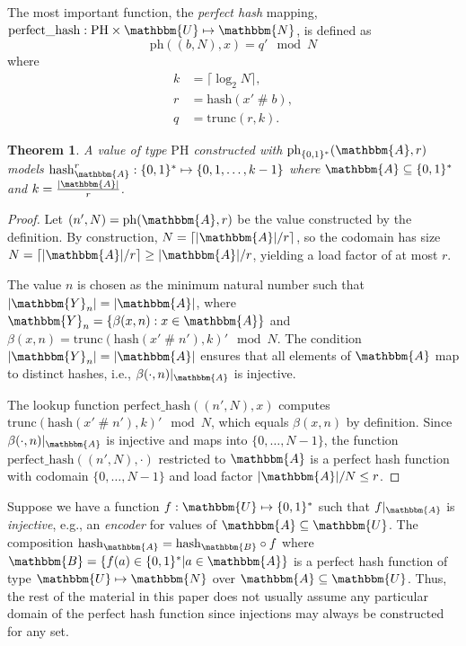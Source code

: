 \documentclass[hidelinks,11pt,final]{article}
\newcommand{\envnumstyle}{section}
\theoremstyle{plain}
\newtheorem{theorem}{Theorem}[\envnumstyle]
\newcommand{\cat}{\mathbin{\#}}
\begin{document}
The most important function, the \emph{perfect hash} mapping, $\mathrm{perfect\_hash} : \mathrm{PH} \times \mathbbm{U} \mapsto \mathbbm{N}$, is defined as
\begin{equation}
	\mathrm{ph}((b,N),x) = q' \mod N
\end{equation}
where
\begin{equation}
\begin{split}
	k &= \lceil \log_2 N \rceil,\\
	r &= \mathrm{hash}(x' \cat b),\\
	q &= \mathrm{trunc}(r,k).
\end{split}
\end{equation}



\begin{theorem}
A value of type $\mathrm{PH}$ constructed with $\mathrm{ph}_{\{0,1\}^*}(\mathbbm{A},r)$ \emph{models} $\mathrm{hash}_{\mathbbm{A}}^{r} : \{0,1\}^* \mapsto \{0,1,\ldots,k-1\}$ where $\mathbbm{A} \subseteq \{0,1\}^*$ and $k = \frac{|\mathbbm{A}|}{r}$.
\end{theorem}
\begin{proof}
Let $(n', N) = \mathrm{ph}(\mathbbm{A}, r)$ be the value constructed by the definition. By construction, $N = \lceil |\mathbbm{A}|/r \rceil$, so the codomain has size $N = \lceil |\mathbbm{A}|/r \rceil \geq |\mathbbm{A}|/r$, yielding a load factor of at most $r$.

The value $n$ is chosen as the minimum natural number such that $|\mathbbm{Y}_n| = |\mathbbm{A}|$, where $\mathbbm{Y}_n = \{\beta(x,n) : x \in \mathbbm{A}\}$ and $\beta(x,n) = \mathrm{trunc}(\mathrm{hash}(x' \cat n'), k)' \mod N$. The condition $|\mathbbm{Y}_n| = |\mathbbm{A}|$ ensures that all elements of $\mathbbm{A}$ map to distinct hashes, i.e., $\beta(\cdot, n)|_{\mathbbm{A}}$ is injective.

The lookup function $\mathrm{perfect\_hash}((n', N), x)$ computes $\mathrm{trunc}(\mathrm{hash}(x' \cat n'), k)' \mod N$, which equals $\beta(x, n)$ by definition. Since $\beta(\cdot, n)|_{\mathbbm{A}}$ is injective and maps into $\{0, \ldots, N-1\}$, the function $\mathrm{perfect\_hash}((n', N), \cdot)$ restricted to $\mathbbm{A}$ is a perfect hash function with codomain $\{0, \ldots, N-1\}$ and load factor $|\mathbbm{A}|/N \leq r$.
\end{proof}

Suppose we have a function $f : \mathbbm{U} \mapsto \{0,1\}^*$ such that $f|_{\mathbbm{A}}$ is \emph{injective}, e.g., an \emph{encoder} for values of $\mathbbm{A} \subseteq \mathbbm{U}$.
The composition $\mathrm{hash}_{\mathbbm{A}} = \mathrm{hash}_{\mathbbm{B}} \circ f$ where $\mathbbm{B} = \{f(a) \in \{0,1\}^*|a \in \mathbbm{A}\}$ is a perfect hash function of type $\mathbbm{U} \mapsto \mathbbm{N}$ over $\mathbbm{A} \subseteq \mathbbm{U}$.
Thus, the rest of the material in this paper does not usually assume any particular domain of the perfect hash function since injections may always be constructed for any set.
\end{document}
